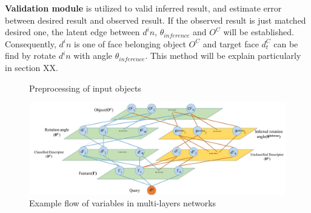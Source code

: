 \documentclass[journal]{IEEEtran}
\begin{document}
\textbf{Validation module} is utilized to valid inferred result, and estimate error between desired result and observed result. If the observed result is just matched desired one, the latent edge between $d^in$, $\theta_{inference}$ and $O^C$ will be established. Consequently, $d^in$ is one of face belonging object $O^C$ and target face $d^C_t$ can be find by rotate $d^in$ with angle  $\theta_{inference}$. This method will be explain particularly in section XX. 


\begin{figure}[!t]
\begin{center}
\caption{Preprocessing of input objects}\label{test}
\end{center}
\end{figure}


\begin{figure}[!t]
\begin{center}
\includegraphics*[width=7 in]{j_img/fig3.jpg}
\caption{Example flow of variables in multi-layers networks}\label{test}
\end{center}
\end{figure}
\end{document}
